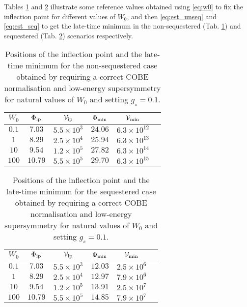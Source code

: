 \documentclass[11pt,a4paper]{article}
\newcommand\vo{{\mathcal{V}}}
\begin{document}
Tables \ref{tab1} and \ref{tab2} illustrate some reference values obtained using \eqref{eq:w0} to fix the inflection point for different values of $W_0$, and then \eqref{eq:est_unseq} and \eqref{eq:est_seq} to get the late-time minimum in the non-sequestered (Tab. \ref{tab1}) and sequestered (Tab. \ref{tab2}) scenarios respectively.

\begin{table}[h!]
\begin{center}
\begin{tabular}{cccccc}
\hline
$W_0$ & $\Phi_{\rm ip}$ & $\vo_{\rm ip}$ & $\Phi_{\rm min}$ & $\vo_{\rm min}$  \\
\hline
$0.1$ & $7.03$ & $5.5 \times 10^3$ & $24.06$  & $6.3 \times 10^{12}$ \\
\hline
$1$ & $8.29$ & $2.5 \times 10^4$ & $25.94$ & $6.3 \times 10^{13}$ \\
\hline
$10$ & $9.54$ & $1.2 \times 10^5$ & $27.82$ & $6.3 \times 10^{14}$ \\
\hline
$100$ & $10.79$ & $5.5 \times 10^5$ & $29.70$ & $6.3 \times 10^{15}$ \\
\hline
\end{tabular}
\end{center}
\caption{Positions of the inflection point and the late-time minimum for the non-sequestered case obtained by requiring a correct COBE normalisation and low-energy supersymmetry for natural values of $W_0$ and setting $g_s=0.1$.}
\label{tab1}
\end{table}

\begin{table}[h!]
\begin{center}
\begin{tabular}{cccccc}
\hline
$W_0$ & $\Phi_{\rm ip}$ & $\vo_{\rm ip}$ & $\Phi_{\rm min}$ & $\vo_{\rm min}$  \\
\hline
$0.1$ & $7.03$ & $5.5 \times 10^3$ & $12.03$  & $2.5 \times 10^{6}$ \\
\hline
$1$ & $8.29$ & $2.5 \times 10^4$ & $12.97$ & $7.9 \times 10^{6}$ \\
\hline
$10$ & $9.54$ & $1.2 \times 10^5$ & $13.91$ & $2.5 \times 10^{7}$ \\
\hline
$100$ & $10.79$ & $5.5 \times 10^5$ & $14.85$ & $7.9 \times 10^{7}$ \\
\hline
\end{tabular}
\end{center}
\caption{Positions of the inflection point and the late-time minimum for the sequestered case obtained by requiring a correct COBE normalisation and low-energy supersymmetry for natural values of $W_0$ and setting $g_s=0.1$.}
\label{tab2}
\end{table}
\end{document}
